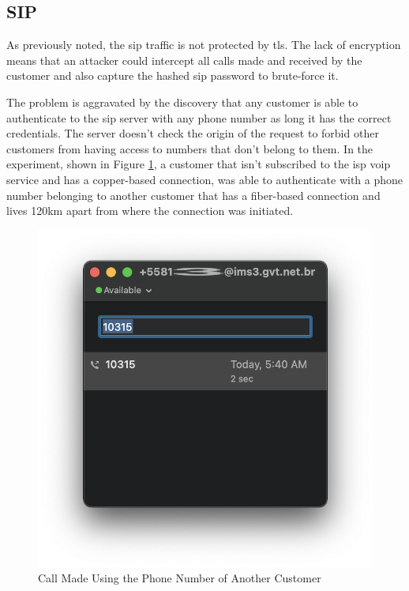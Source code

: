 \subsection{SIP}

As previously noted, the \gls{sip} traffic is not protected by \gls{tls}. The lack of encryption means that an attacker could intercept all calls made and received by the customer and also capture the hashed \gls{sip} password to brute-force it.

The problem is aggravated by the discovery that any customer is able to authenticate to the \gls{sip} server with any phone number as long it has the correct credentials. The server doesn’t check the origin of the request to forbid other customers from having access to numbers that don’t belong to them. In the experiment, shown in Figure \ref{figure:sip_call}, a customer that isn’t subscribed to the \gls{isp} \gls{voip} service and has a copper-based connection, was able to authenticate with a phone number belonging to another customer that has a fiber-based connection and lives 120km apart from where the connection was initiated.

\begin{figure}[h]
    \centering
    \includegraphics[width=\linewidth]{contents/isp-side-services-analysis/sip/sip-call.png}
    \caption{Call Made Using the Phone Number of Another Customer}
    \label{figure:sip_call}
\end{figure}

